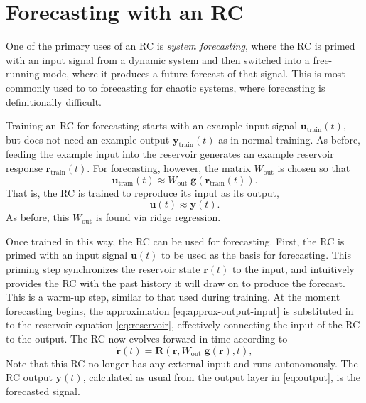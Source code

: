 \section{Forecasting with an RC}\label{sec:forecasting}

One of the primary uses of an RC is \emph{system forecasting}, where
the RC is primed with an input signal from a dynamic system and then
switched into a free-running mode, where it produces a future forecast
of that signal. This is most commonly used to to forecasting for
chaotic systems, where forecasting is definitionally difficult.

Training an RC for forecasting starts with an example input signal
$\bm{u}_\text{train}(t)$, but does not need an example output
$\bm{y}_\text{train}(t)$ as in normal training. As before, feeding the
example input into the reservoir generates an example reservoir
response $\bm{r}_\text{train}(t)$. For forecasting, however, the matrix
$W_\text{out}$ is chosen so that
\begin{equation}
  \label{eq:approx-output-forecast}
  \mathbf{u}_\text{train}(t) \approx W_\text{out}\;\mathbf{g}\left(\mathbf{r}_\text{train}(t)\right).
\end{equation}
That is, the RC is trained to reproduce its input as its output,
\begin{equation}
  \label{eq:approx-output-input}
  \bm{u}(t) \approx \bm{y}(t).
\end{equation}
As before, this $W_\text{out}$ is found via ridge regression.

Once trained in this way, the RC can be used for forecasting. First,
the RC is primed with an input signal $\bm{u}(t)$ to be used as the
basis for forecasting. This priming step synchronizes the reservoir
state $\bm{r}(t)$ to the input, and intuitively provides the RC with
the past history it will draw on to produce the forecast. This is a
warm-up step, similar to that used during training. At the moment
forecasting begins, the approximation \cref{eq:approx-output-input} is
substituted in to the reservoir equation \cref{eq:reservoir},
effectively connecting the input of the RC to the output. The RC now
evolves forward in time according to
\begin{equation}
  \label{eq:reservoir-auto}
  \dot{\mathbf{r}}(t) = \mathbf{R}\left(\mathbf{r}, W_\text{out}\;\bm{g}(\bm{r}), t\right),
\end{equation}
Note that this RC no longer has any external input and runs
autonomously. The RC output $\bm{y}(t)$, calculated as usual from the
output layer in \cref{eq:output}, is the forecasted signal.

